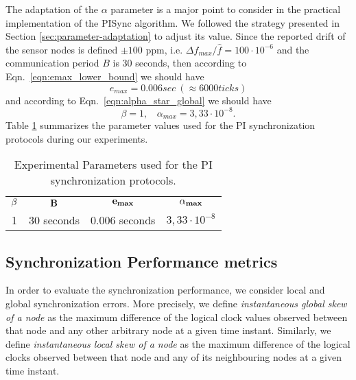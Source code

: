 \documentclass[english,a4paper,10pt,final]{article}
\numberwithin{equation}{section}
\numberwithin{figure}{section}
\begin{document}
The adaptation of the $\alpha$ parameter is a major point to consider in the practical implementation of the PISync algorithm. We followed the strategy presented in Section \ref{sec:parameter-adaptation} to adjust its value. Since the reported drift of the sensor nodes is defined $\pm 100$ ppm, i.e. $\Delta f_{max}/\hat f = 100\cdot 10^{-6}$ and the communication period $B$ is 30 seconds, then according to  Eqn.~\eqref{eqn:emax_lower_bound} we should have $$e_{max} = 0.006 sec \ (\approx6000 ticks)$$ and according to Eqn.~\eqref{eqn:alpha_star_global} we should have
$$\beta=1, \ \  \ \  \alpha_{max} = 3,33\cdot 10^{-8}.$$
Table \ref{tab:PI-Experimental-Parameters} summarizes the parameter values used for the PI synchronization protocols during our experiments.

\begin{table}

\center
\caption{Experimental Parameters used for the PI synchronization protocols.\label{tab:PI-Experimental-Parameters}}

\begin{tabular}{cccc}
$\bf{\beta}$ & $\bf{B}$ & $\bf{e_{max}}$ & $\bf{\alpha_{max}}$  \\ 
1 & 30 seconds & 0.006 seconds & $3,33\cdot 10^{-8}$ 
\end{tabular}


\end{table}

\subsection{Synchronization Performance metrics}

In order to evaluate the synchronization performance, we consider local and global synchronization errors. More precisely, we define \textit{instantaneous global skew of a node} as the maximum difference of the logical clock values observed between that node and any other arbitrary node at a given time instant. Similarly, we define \textit{instantaneous local skew of a node} as the maximum difference of the logical clocks observed between that node and any of its neighbouring nodes at a given time instant. 
\end{document}
